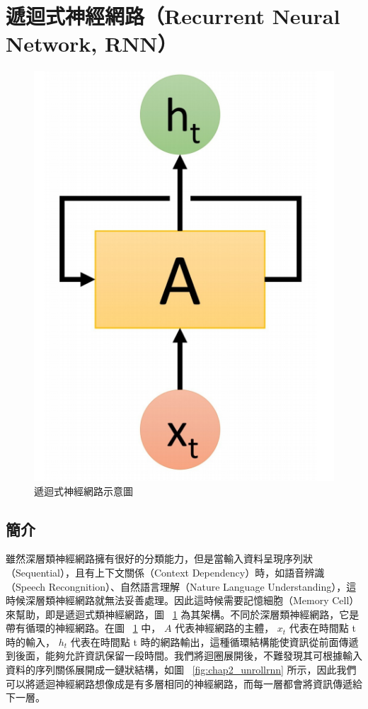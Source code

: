\section{遞迴式神經網路（Recurrent Neural Network, RNN）}
\begin{figure}[b]
    \centering
    \includegraphics[scale=0.25]{images/chap2_rnn.png}
    \caption{遞迴式神經網路示意圖\cite{shen2016} }\label{fig:chap2_rnn}
\end{figure}
\subsection{簡介}
雖然深層類神經網路擁有很好的分類能力，但是當輸入資料呈現序列狀（Sequential），且有上下文關係（Context Dependency）時，如語音辨識（Speech Recongnition）、自然語言理解（Nature Language Understanding），這時候深層類神經網路就無法妥善處理。因此這時候需要記憶細胞（Memory Cell）來幫助，即是遞迴式類神經網路，圖 ~\ref{fig:chap2_rnn} 為其架構。不同於深層類神經網路，它是帶有循環的神經網路。在圖 ~\ref{fig:chap2_rnn} 中， $A$ 代表神經網路的主體， $x_t$ 代表在時間點 t 時的輸入， $h_t$ 代表在時間點 t 時的網路輸出，這種循環結構能使資訊從前面傳遞到後面，能夠允許資訊保留一段時間。我們將迴圈展開後，不難發現其可根據輸入資料的序列關係展開成一鏈狀結構，如圖 ~\ref{fig:chap2_unrollrnn} 所示，因此我們可以將遞迴神經網路想像成是有多層相同的神經網路，而每一層都會將資訊傳遞給下一層。

